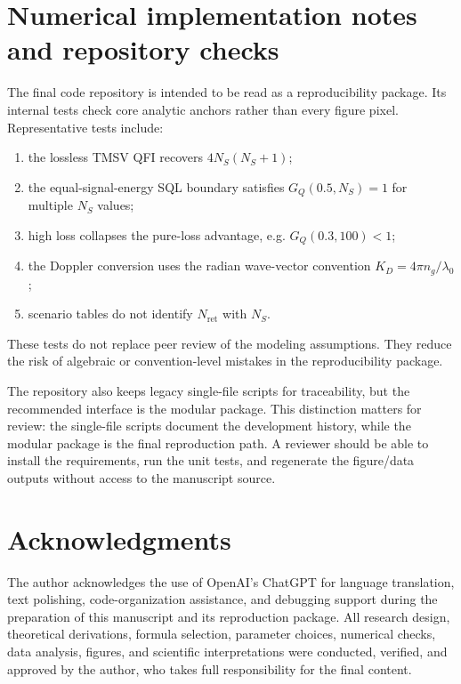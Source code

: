 \documentclass[a4paper,11pt]{article}
\numberwithin{equation}{section}
\newcommand{\Nret}{N_{\mathrm{ret}}}
\newcommand{\Ns}{N_{S}}
\newcommand{\GQ}{G_Q}
\begin{document}
\section{Numerical implementation notes and repository checks}
\label{app:implementation}

The final code repository is intended to be read as a reproducibility package. Its internal tests check core analytic anchors rather than every figure pixel. Representative tests include:
\begin{enumerate}[label=(\alph*)]
  \item the lossless TMSV QFI recovers $4\Ns(\Ns+1)$;
  \item the equal-signal-energy SQL boundary satisfies $\GQ(0.5,\Ns)=1$ for multiple $\Ns$ values;
  \item high loss collapses the pure-loss advantage, e.g. $\GQ(0.3,100)<1$;
  \item the Doppler conversion uses the radian wave-vector convention $K_D=4\pi n_g/\lambda_0$;
  \item scenario tables do not identify $\Nret$ with $\Ns$.
\end{enumerate}
These tests do not replace peer review of the modeling assumptions. They reduce the risk of algebraic or convention-level mistakes in the reproducibility package.

The repository also keeps legacy single-file scripts for traceability, but the recommended interface is the modular package. This distinction matters for review: the single-file scripts document the development history, while the modular package is the final reproduction path. A reviewer should be able to install the requirements, run the unit tests, and regenerate the figure/data outputs without access to the manuscript source.
\section*{Acknowledgments}

The author acknowledges the use of OpenAI's ChatGPT for language translation, text polishing, code-organization assistance, and debugging support during the preparation of this manuscript and its reproduction package. All research design, theoretical derivations, formula selection, parameter choices, numerical checks, data analysis, figures, and scientific interpretations were conducted, verified, and approved by the author, who takes full responsibility for the final content.
\end{document}
